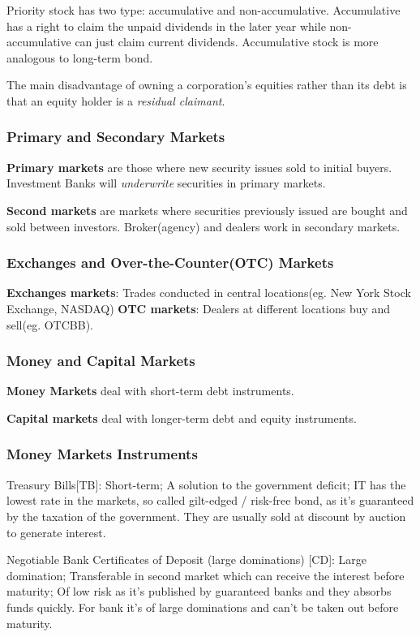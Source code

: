 \documentclass[10pt, a4paper]{article}
\begin{document}
                Priority stock has two type: accumulative and non-accumulative. Accumulative has a right to claim the unpaid dividends in the later year while non-accumulative can just claim current dividends. Accumulative stock is more analogous to long-term bond. 

                The main disadvantage of owning a corporation's equities rather than its debt is that an equity holder is a \emph{residual claimant}.
            \subsubsection{Primary and Secondary Markets}
                \textbf{Primary markets} are those where new security issues sold to initial buyers. Investment Banks will \emph{underwrite} securities in primary markets.  

                \textbf{Second markets} are markets where securities previously issued are bought and sold between investors. Broker(agency) and dealers  work in secondary markets. 
            \subsubsection{Exchanges and Over-the-Counter(OTC) Markets} 
                \textbf{Exchanges markets}: Trades conducted in central locations(eg. New York Stock Exchange, NASDAQ)      
                \textbf{OTC markets}: Dealers at different locations buy and sell(eg. OTCBB).  
            \subsubsection{Money and Capital Markets}
                \textbf{Money Markets} deal with short-term debt instruments. 
                
                \textbf{Capital markets} deal with longer-term debt and equity instruments. 
                
            \subsubsection{Money Markets Instruments}
                Treasury Bills[TB]: Short-term; A solution to the government deficit; IT has the lowest rate in the markets, so called gilt-edged / risk-free  bond, as it's guaranteed by the taxation of the government. They are usually sold at discount by auction to generate interest.
                
                Negotiable Bank Certificates of Deposit (large dominations) [CD]: Large domination; Transferable in second market which can receive the interest before maturity; Of low risk as it's published by guaranteed banks and they absorbs funds quickly. For bank it's of large dominations and can't be taken out before maturity. 
                
\end{document}
